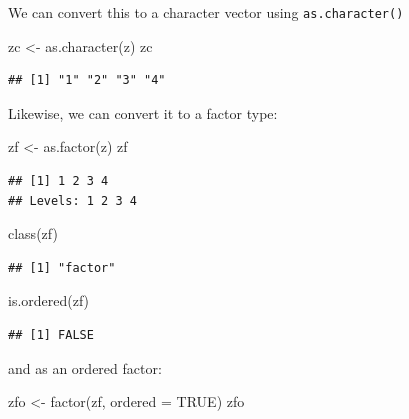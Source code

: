 \documentclass[
]{book}
\newenvironment{Shaded}{\begin{snugshade}}{\end{snugshade}}
\newcommand{\AttributeTok}[1]{\textcolor[rgb]{0.77,0.63,0.00}{#1}}
\newcommand{\ConstantTok}[1]{\textcolor[rgb]{0.00,0.00,0.00}{#1}}
\newcommand{\FunctionTok}[1]{\textcolor[rgb]{0.00,0.00,0.00}{#1}}
\newcommand{\NormalTok}[1]{#1}
\newcommand{\OtherTok}[1]{\textcolor[rgb]{0.56,0.35,0.01}{#1}}
\begin{document}
We can convert this to a character vector using \texttt{as.character()}

\begin{Shaded}
\begin{Highlighting}[]
\NormalTok{zc }\OtherTok{\textless{}{-}}  \FunctionTok{as.character}\NormalTok{(z)}
\NormalTok{zc}
\end{Highlighting}
\end{Shaded}

\begin{verbatim}
## [1] "1" "2" "3" "4"
\end{verbatim}

Likewise, we can convert it to a factor type:

\begin{Shaded}
\begin{Highlighting}[]
\NormalTok{zf }\OtherTok{\textless{}{-}} \FunctionTok{as.factor}\NormalTok{(z)}
\NormalTok{zf}
\end{Highlighting}
\end{Shaded}

\begin{verbatim}
## [1] 1 2 3 4
## Levels: 1 2 3 4
\end{verbatim}

\begin{Shaded}
\begin{Highlighting}[]
\FunctionTok{class}\NormalTok{(zf)}
\end{Highlighting}
\end{Shaded}

\begin{verbatim}
## [1] "factor"
\end{verbatim}

\begin{Shaded}
\begin{Highlighting}[]
\FunctionTok{is.ordered}\NormalTok{(zf)}
\end{Highlighting}
\end{Shaded}

\begin{verbatim}
## [1] FALSE
\end{verbatim}

and as an ordered factor:

\begin{Shaded}
\begin{Highlighting}[]
\NormalTok{zfo }\OtherTok{\textless{}{-}} \FunctionTok{factor}\NormalTok{(zf, }
              \AttributeTok{ordered =} \ConstantTok{TRUE}\NormalTok{)}
\NormalTok{zfo}
\end{Highlighting}
\end{Shaded}
\end{document}
